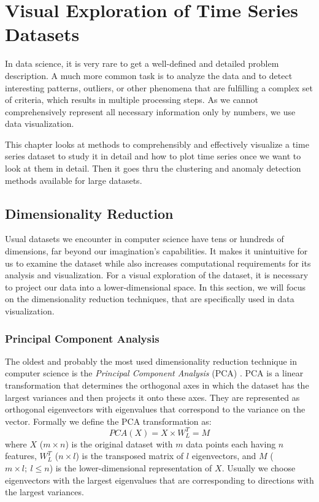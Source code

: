 \chapter{Visual Exploration of Time Series Datasets}
In data science, it is very rare to get a well-defined and detailed problem description. A much more common task is to analyze the data and to detect interesting patterns, outliers, or other phenomena that are fulfilling a complex set of criteria, which results in multiple processing steps. As we cannot comprehensively represent all necessary information only by numbers, we use data visualization. 

This chapter looks at methods to comprehensibly and effectively visualize a time series dataset to study it in detail and how to plot time series once we want to look at them in detail. Then it goes thru the clustering and anomaly detection methods available for large datasets.

\section{Dimensionality Reduction}
Usual datasets we encounter in computer science have tens or hundreds of dimensions, far beyond our imagination's capabilities. It makes it unintuitive for us to examine the dataset while also increases computational requirements for its analysis and visualization. For a visual exploration of the dataset, it is necessary to project our data into a lower-dimensional space. In this section, we will focus on the dimensionality reduction techniques, that are specifically used in data visualization.

\subsection{Principal Component Analysis}
The oldest and probably the most used dimensionality reduction technique in computer science is the \textit{Principal Component Analysis} (PCA) \cite{vis:pca}. PCA is a linear transformation that determines the orthogonal axes in which the dataset has the largest variances and then projects it onto these axes. They are represented as orthogonal eigenvectors with eigenvalues that correspond to the variance on the vector. Formally we define the PCA transformation as:
\begin{equation}
    PCA(X) = X \times W_L^T = M
\end{equation}
where $X$ ($m \times n$) is the original dataset with $m$ data points each having $n$ features, $W^T_L$ ($n \times l$) is the transposed matrix of $l$ eigenvectors, and $M$ ($m \times l;~ l \leq n$) is the lower-dimensional representation of $X$. Usually we choose eigenvectors with the largest eigenvalues that are corresponding to directions with the largest variances.

